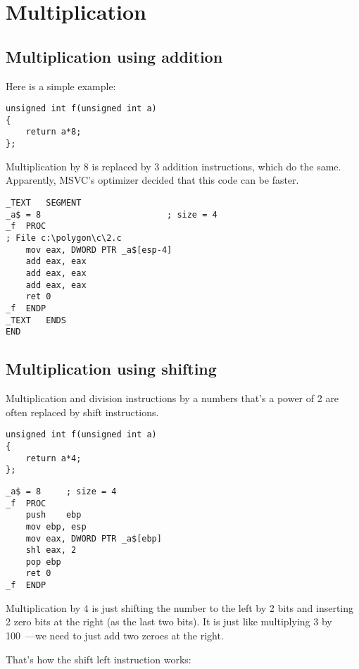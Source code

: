 ﻿\section{Multiplication}

\subsection{Multiplication using addition}

Here is a simple example:

\begin{lstlisting}[caption=\Optimizing MSVC 2010]
unsigned int f(unsigned int a)
{
	return a*8;
};
\end{lstlisting}

Multiplication by 8 is replaced by 3 addition instructions, which do the same.
Apparently, MSVC's optimizer decided that this code can be faster.

\begin{lstlisting}
_TEXT	SEGMENT
_a$ = 8							; size = 4
_f	PROC
; File c:\polygon\c\2.c
	mov	eax, DWORD PTR _a$[esp-4]
	add	eax, eax
	add	eax, eax
	add	eax, eax
	ret	0
_f	ENDP
_TEXT	ENDS
END
\end{lstlisting}

\subsection{Multiplication using shifting}
\label{subsec:mult_using_shifts}

Multiplication and division instructions by a numbers that's a power of 2 are often replaced by shift instructions.

\begin{lstlisting}
unsigned int f(unsigned int a)
{
	return a*4;
};
\end{lstlisting}

\begin{lstlisting}[caption=\NonOptimizing MSVC 2010]
_a$ = 8		; size = 4
_f	PROC
	push	ebp
	mov	ebp, esp
	mov	eax, DWORD PTR _a$[ebp]
	shl	eax, 2
	pop	ebp
	ret	0
_f	ENDP
\end{lstlisting}


Multiplication by 4 is just shifting the number to the left by 2 bits
and inserting 2 zero bits at the right (as the last two bits).
It is just like multiplying 3 by 100~---we need to just add two zeroes at the right.

That's how the shift left instruction works:



